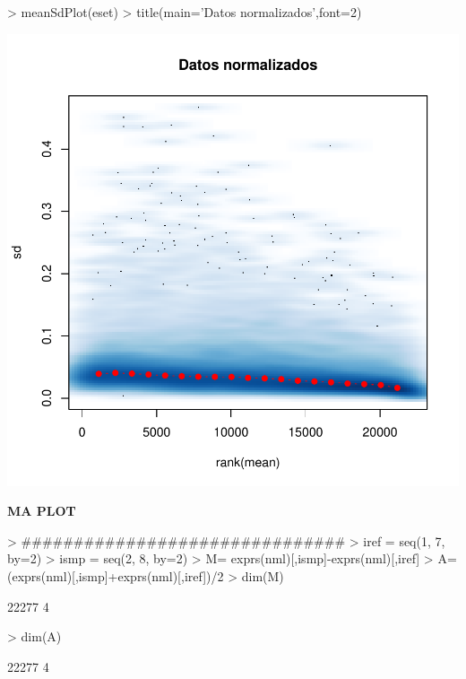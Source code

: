 \documentclass{article}
\begin{document}
\begin{Schunk}
\begin{Sinput}
> meanSdPlot(eset)
> title(main='Datos normalizados',font=2)
\end{Sinput}
\end{Schunk}
\includegraphics{JuanHenao_Taller3-002}

\textbf{MA PLOT}

\begin{Schunk}
\begin{Sinput}
> ###############################
> iref = seq(1, 7, by=2)
> ismp = seq(2, 8, by=2)
> M= exprs(nml)[,ismp]-exprs(nml)[,iref] 
> A=(exprs(nml)[,ismp]+exprs(nml)[,iref])/2
> dim(M)
\end{Sinput}
\begin{Soutput}
[1] 22277     4
\end{Soutput}
\begin{Sinput}
> dim(A)
\end{Sinput}
\begin{Soutput}
[1] 22277     4
\end{Soutput}
\end{Schunk}
\end{document}
